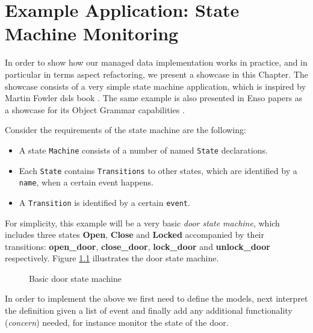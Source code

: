 
\chapter{Example Application: State Machine Monitoring}\label{Example Application}
In order to show how our managed data implementation works in practice, and in particular in terms aspect refactoring, we present a showcase in this Chapter.
The showcase consists of a very simple state machine application, which is inspired by Martin Fowler \ac{dsl}s book \cite{fowler2010domain}.
The same example is also presented in Enso papers as a showcase for its Object Grammar capabilities \cite{storm2012object}.

Consider the requirements of the state machine are the following: 
\begin{itemize}
	\item A state \texttt{Machine} consists of a number of named \texttt{State} declarations.

	\item Each \texttt{State} contains \texttt{Transitions} to other states, which are identified by a \texttt{name}, when a certain event happens.

	\item A \texttt{Transition} is identified by a certain \texttt{event}.
\end{itemize}

For simplicity, this example will be a very basic \textit{door state machine}, which includes three states \textbf{Open}, \textbf{Close} and \textbf{Locked} accompanied by their transitions: \textbf{open\_door}, \textbf{close\_door}, \textbf{lock\_door} and \textbf{unlock\_door} respectively.
Figure \ref{fig:State_machine} illustrates the door state machine.

\begin{figure}[H]
	\centering
  	\caption{Basic door state machine}
  	\label{fig:State_machine}
\end{figure}

In order to implement the above we first need to define the models, next interpret the definition given a list of event and finally add any additional functionality (\textit{concern}) needed, for instance monitor the state of the door.

